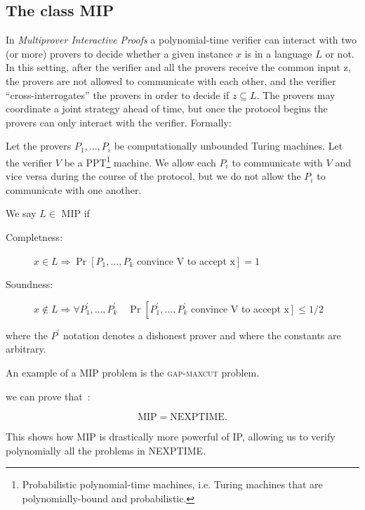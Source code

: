 \subsection{The class MIP}
In \emph{Multiprover Interactive Proofs} a polynomial-time verifier can interact with two (or more) provers to decide
whether a given instance $x$ is in a language $L$ or not. In this setting, after the verifier and all the provers receive the common input z, the provers are not allowed to communicate with each other, and the verifier “cross-interrogates” the provers in order to decide if $z \subseteq L$. The provers may coordinate a joint strategy ahead of time, but once the protocol begins the provers can only interact with the verifier. Formally:
\begin{defn}
    Let the provers $P_{1}, \ldots, P_{i}$ be computationally unbounded Turing machines. Let the verifier $V$ be a PPT\footnote{Probabilistic polynomial-time machines, i.e. Turing machines that are polynomially-bound and probabilistic.} machine. We allow each $P_{i}$ to communicate with $V$ and vice versa during the course of the protocol, but we do not allow the $P_{i}$ to communicate with one another. 
    
    We say $L \in$ MIP if 
    \begin{description}
\item[Completness: ]$x \in L \Rightarrow \operatorname{Pr}\left[P_{1}, \ldots, P_{k}\right.$ convince $\mathrm{V}$ to accept $\left.\mathrm{x}\right]=1$
\item[Soundness: ]$x \notin L \Rightarrow \forall P_{1}^{\prime}, \ldots, P_{k}^{\prime} \quad \operatorname{Pr}\left[P_{1}^{\prime}, \ldots, P_{k}^{\prime}\right.$ convince $\mathrm{V}$ to accept $\left.\mathrm{x}\right] \leq 1 / 2$
    \end{description}   
    where the $P^{\prime}$ notation denotes a dishonest prover and where the constants are arbitrary.
\end{defn}

An example of a MIP problem is the \textsc{gap-maxcut} problem.

we can prove that~\cite{topicsin}:
\begin{theorem}
    \begin{equation}
\text{MIP}=\text{NEXPTIME}.
    \end{equation}
\end{theorem}

This shows how MIP is drastically more powerful of IP, allowing us to verify polynomially all the problems in NEXPTIME.


